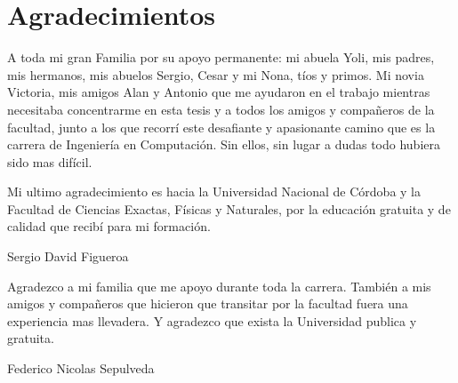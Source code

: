 \chapter*{\Large Agradecimientos}

A toda mi gran Familia por su apoyo permanente: mi abuela Yoli, mis padres, mis hermanos, mis abuelos Sergio, Cesar y mi Nona, tíos y primos. Mi novia Victoria, mis amigos Alan y Antonio que me ayudaron en el trabajo mientras necesitaba concentrarme en esta tesis y a todos los amigos y compañeros de la facultad, junto a los que recorrí este desafiante y apasionante camino que es la carrera de Ingeniería en Computación. Sin ellos, sin lugar a dudas todo hubiera sido mas difícil. \par Mi ultimo agradecimiento es hacia la Universidad Nacional de Córdoba y la Facultad de Ciencias Exactas, Físicas y Naturales, por la educación gratuita y de calidad que recibí para mi formación.\par 
\begin{large} \begin{center}
         Sergio David Figueroa 
        \end{center}
        \end{large}

Agradezco a mi familia que me apoyo durante toda la carrera. También a mis amigos y compañeros que hicieron que transitar por la facultad fuera una experiencia mas llevadera. Y agradezco que exista la Universidad publica y gratuita. \par
\begin{large} \begin{center}
         Federico Nicolas Sepulveda 
        \end{center}
        \end{large}